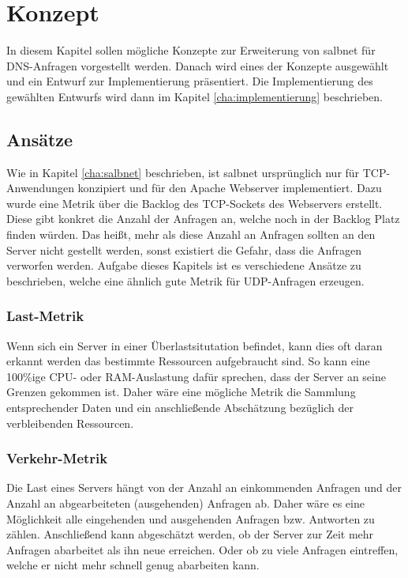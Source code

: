 \documentclass[a4paper, 12pt, BCOR10mm, DIV12, toc=bibliography, toc=listof, german]{scrbook}
\begin{document}

	\chapter{Konzept} %
	\label{cha:konzept}

	In diesem Kapitel sollen mögliche Konzepte zur Erweiterung von salbnet für DNS-Anfragen
	vorgestellt werden. Danach wird eines der Konzepte ausgewählt und ein Entwurf zur Implementierung
	präsentiert. Die Implementierung des gewählten Entwurfs wird dann im Kapitel
	\ref{cha:implementierung} beschrieben.


		\section{Ansätze} %
		\label{sec:ansaetze}

		Wie in Kapitel \ref{cha:salbnet} beschrieben, ist salbnet ursprünglich nur für TCP-Anwendungen
		konzipiert und für den Apache Webserver implementiert. Dazu wurde eine Metrik über die Backlog
		des TCP-Sockets des Webservers erstellt. Diese gibt konkret die Anzahl der Anfragen an, welche
		noch in der Backlog Platz finden würden. Das heißt, mehr als diese Anzahl an Anfragen sollten an
		den Server nicht gestellt werden, sonst existiert die Gefahr, dass die Anfragen verworfen
		werden. Aufgabe dieses Kapitels ist es verschiedene Ansätze zu beschrieben, welche eine ähnlich
		gute Metrik für UDP-Anfragen erzeugen. 

		\subsection*{Last-Metrik} %

		Wenn sich ein Server in einer Überlastsitutation befindet, kann dies oft daran erkannt werden
		das bestimmte Ressourcen aufgebraucht sind. So kann eine 100\%ige CPU- oder RAM-Auslastung dafür
		sprechen, dass der Server an seine Grenzen gekommen ist. Daher wäre eine mögliche Metrik die
		Sammlung entsprechender Daten und ein anschließende Abschätzung bezüglich der verbleibenden
		Ressourcen.
		

		\subsection*{Verkehr-Metrik} %

		Die Last eines Servers hängt von der Anzahl an einkommenden Anfragen und der Anzahl an
		abgearbeiteten (ausgehenden) Anfragen ab. Daher wäre es eine Möglichkeit alle eingehenden und
		ausgehenden Anfragen bzw. Antworten zu zählen. Anschließend kann abgeschätzt werden, ob der
		Server zur Zeit mehr Anfragen abarbeitet als ihn neue erreichen. Oder ob zu viele Anfragen
		eintreffen, welche er nicht mehr schnell genug abarbeiten kann.
		
\end{document}
